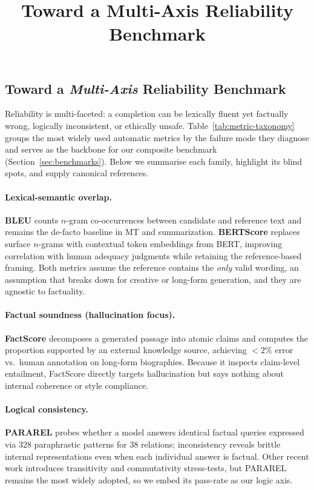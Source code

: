 \documentclass[11pt]{article}
\title{Toward a Multi-Axis Reliability Benchmark}
\author{}
\date{}
\begin{document}
\maketitle

\subsection{Toward a \emph{Multi-Axis} Reliability Benchmark}
\label{sec:metric-landscape}

Reliability is multi-faceted: a completion can be lexically fluent yet factually wrong, logically inconsistent, or ethically unsafe.  
Table~\ref{tab:metric-taxonomy} groups the most widely used automatic metrics by the failure mode they diagnose and serves as the backbone for our composite benchmark (Section~\ref{sec:benchmarks}).  
Below we summarise each family, highlight its blind spots, and supply canonical references.

\paragraph{Lexical-semantic overlap.}
\textbf{BLEU} \cite{papineni-etal-2002-bleu} counts $n$-gram co-occurrences between candidate and reference text and remains the de-facto baseline in MT and summarization.   
\textbf{BERTScore} \cite{zhang-etal-2020-bertscore} replaces surface $n$-grams with contextual token embeddings from BERT, improving correlation with human adequacy judgments while retaining the reference-based framing.  
Both metrics assume the reference contains the \emph{only} valid wording, an assumption that breaks down for creative or long-form generation, and they are agnostic to factuality.

\paragraph{Factual soundness (hallucination focus).}
\textbf{FactScore} \cite{min-etal-2023-factscore} decomposes a generated passage into atomic claims and computes the proportion supported by an external knowledge source, achieving $<\!2\%$ error vs.\ human annotation on long-form biographies.  
Because it inspects claim-level entailment, FactScore directly targets hallucination but says nothing about internal coherence or style compliance.

\paragraph{Logical consistency.}
\textbf{PARAREL} \cite{elazar-etal-2021-pararel} probes whether a model answers identical factual queries expressed via 328 paraphrastic patterns for 38 relations; inconsistency reveals brittle internal representations even when each individual answer is factual.  
Other recent work introduces transitivity and commutativity stress-tests, but PARAREL remains the most widely adopted, so we embed its pass-rate as our logic axis.
\end{document}

